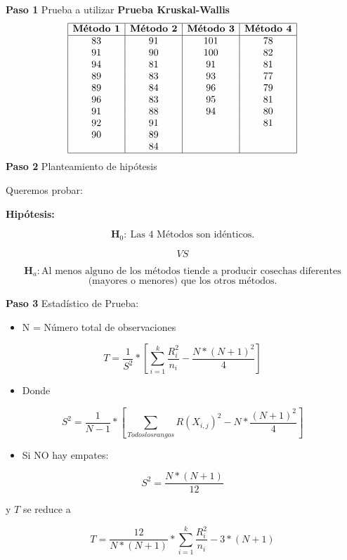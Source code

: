 \documentclass[
  a4paper,
  oneside,
  openany]{book}
\providecommand{\tightlist}{%
  \setlength{\itemsep}{0pt}\setlength{\parskip}{0pt}}
\begin{document}
\textbf{Paso 1} Prueba a utilizar \textbf{Prueba Kruskal-Wallis}
\[
\begin{array}{|c| c| c| c|} 
\hline
\textbf{Método 1} & \textbf{Método 2} & \textbf{Método 3} & \textbf{Método 4}\\
\hline
83&91&101&78\\
91&90&100&82\\
94&81&91&81\\
89&83&93&77\\
89&84&96&79\\
96&83&95&81\\
91&88&94&80\\
92&91&  &81\\
90&89&  &\\
  &84&  &\\
  \hline
\end{array}
\]
\textbf{Paso 2} Planteamiento de hipótesis

Queremos probar:

\textbf{Hipótesis:}

\[\textbf{H}_0: \ \mbox{Las 4 Métodos son idénticos.}\]

\[VS\]

\[\textbf{H}_a: \mbox{Al menos alguno de los métodos tiende a producir cosechas diferentes}\]
\[\mbox{(mayores o menores) que los otros métodos.}\]

\textbf{Paso 3} Estadístico de Prueba:

\begin{itemize}
\tightlist
\item
  N = Número total de observaciones
\end{itemize}

\[T= \frac{1}{S^2}*\left[\sum_{i=1}^{k}\frac{R_{i}^2}{n_{i}} - \frac{N*(N+1)^2}{4}\right]\]

\begin{itemize}
\tightlist
\item
  Donde
\end{itemize}

\[ S^2 = \frac{1}{N-1}*\left[\sum_{Todos los rangos}R(X_{i,j})^2 - N*\frac{(N+1)^2}{4}\right] \]

\begin{itemize}
\tightlist
\item
  Si NO hay empates:
\end{itemize}

\[S^2= \frac{N*(N+1)}{12}\]

y \(T\) se reduce a

\[T= \frac{12}{N*(N+1)}*\sum_{i=1}^{k}\frac{R_{i}^2}{n_{i}} - 3*(N+1)\]
\end{document}

